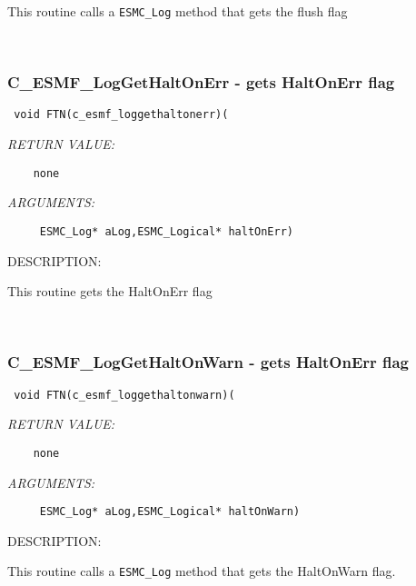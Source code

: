    This routine calls a {\tt ESMC\_Log} method that gets the flush flag
   
 
\mbox{}\hrulefill\ 
 
\subsubsection [C\_ESMF\_LogGetHaltOnErr] {C\_ESMF\_LogGetHaltOnErr - gets HaltOnErr flag }


  
\begin{verbatim} void FTN(c_esmf_loggethaltonerr)(\end{verbatim}{\em RETURN VALUE:}
\begin{verbatim}    none\end{verbatim}{\em ARGUMENTS:}
\begin{verbatim}     ESMC_Log* aLog,ESMC_Logical* haltOnErr)\end{verbatim}
{\sf DESCRIPTION:\\ }


   This routine gets the HaltOnErr flag
   
 
\mbox{}\hrulefill\ 
 
\subsubsection [C\_ESMF\_LogGetHaltOnWarn] {C\_ESMF\_LogGetHaltOnWarn - gets HaltOnErr flag}


  
\begin{verbatim} void FTN(c_esmf_loggethaltonwarn)(\end{verbatim}{\em RETURN VALUE:}
\begin{verbatim}    none\end{verbatim}{\em ARGUMENTS:}
\begin{verbatim}     ESMC_Log* aLog,ESMC_Logical* haltOnWarn)\end{verbatim}
{\sf DESCRIPTION:\\ }


    This routine calls a {\tt ESMC\_Log} method that gets the HaltOnWarn flag.
  
